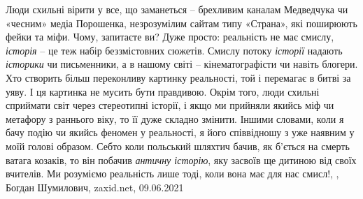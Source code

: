 Люди схильні вірити у все, що заманеться – брехливим каналам Медведчука чи
«чесним» медіа Порошенка, незрозумілим сайтам типу «Страна», які поширюють
фейки та міфи. Чому, запитаєте ви? Дуже просто: реальність не має смислу,
\emph{історія} – це теж набір беззмістовних сюжетів. Смислу потоку \emph{історії} надають
\emph{історики} чи письменники, а в нашому світі – кінематографісти чи навіть блогери.
Хто створить більш переконливу картинку реальності, той і перемагає в битві за
уяву. І ця картинка не мусить бути правдивою. Окрім того, люди схильні
сприймати світ через стереотипні історії, і якщо ми прийняли якийсь міф чи
метафору з раннього віку, то її дуже складно змінити. Іншими словами, коли я
бачу подію чи якийсь феномен у реальності, я його співвідношу з уже наявним у
моїй голові образом. Себто коли польський шляхтич бачив, як б'ється на смерть
ватага козаків, то він побачив \emph{античну історію}, яку засвоїв ще дитиною від
своїх вчителів. Ми розуміємо реальність лише тоді, коли вона має для нас смисл!,
, Богдан Шумилович, zaxid.net, 09.06.2021

